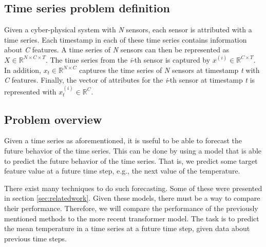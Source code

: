 \subsection{Time series problem definition}
Given a cyber-physical system with \textit{N} sensors, each sensor is attributed with a time series.
Each timestamp in each of these time series contains information about \textit{C} features.
A time series of \textit{N} sensors can then be represented as \(X \in \mathbb{R}^{N \times C \times T}\).
The time series from the \textit{i}-th sensor is captured by \(x^{(i)} \in \mathbb{R}^{C \times T} \).
In addition, \(x_{t} \in \mathbb{R}^{N \times C}\) captures the time series of \textit{N} sensors at timestamp \textit{t} with \textit{C} features.
Finally, the vector of attributes for the \textit{i}-th sensor at timestamp \textit{t} is represented with \(x_{t}^{(i)} \in \mathbb{R}^{C}\). \cite{cirsteaEnhanceNetPluginNeural2021}


\subsection{Problem overview}
Given a time series as aforementioned, it is useful to be able to forecast the future behavior of the time series.
This can be done by using a model that is able to predict the future behavior of the time series.
That is, we predict some target feature value at a future time step, e.g., the next value of the temperature.


There exist many techniques to do such forecasting. Some of these were presented in section \ref{sec:relatedwork}.
Given these models, there must be a way to compare their performance.
Therefore, we will compare the performance of the previously mentioned methods to the more recent transformer model.
The task is to predict the mean temperature in a time series at a future time step, given data about previous time steps.